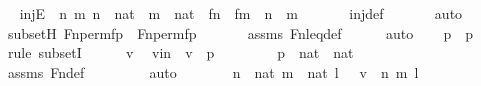 \begin{isabellebody}
\ \isamarkupfalse%
\ injE{\isacharcolon}{\kern0pt}\ {\isachardoublequoteopen}{\isasymAnd}\ n\ m{\isachardot}{\kern0pt}\ n\ {\isasymin}\ nat\ {\isasymLongrightarrow}\ m\ {\isasymin}\ nat\ {\isasymLongrightarrow}\ f{\isacharbackquote}{\kern0pt}n\ {\isacharequal}{\kern0pt}\ f{\isacharbackquote}{\kern0pt}m\ {\isasymLongrightarrow}\ n\ {\isacharequal}{\kern0pt}\ m{\isachardoublequoteclose}\ \isanewline
\ \ \ \ \isamarkupfalse%
\ inj{\isacharunderscore}{\kern0pt}def\ \isanewline
\ \ \ \ \isamarkupfalse%
\ auto\isanewline
\isanewline
\ \ \isamarkupfalse%
\ subsetH{\isacharcolon}{\kern0pt}\ {\isachardoublequoteopen}Fn{\isacharunderscore}{\kern0pt}perm{\isacharprime}{\kern0pt}{\isacharparenleft}{\kern0pt}f{\isacharparenright}{\kern0pt}{\isacharbackquote}{\kern0pt}p{\isacharprime}{\kern0pt}\ {\isasymsubseteq}\ Fn{\isacharunderscore}{\kern0pt}perm{\isacharprime}{\kern0pt}{\isacharparenleft}{\kern0pt}f{\isacharparenright}{\kern0pt}{\isacharbackquote}{\kern0pt}p{\isachardoublequoteclose}\ \isanewline
\ \ \ \ \isamarkupfalse%
\ assms\ Fn{\isacharunderscore}{\kern0pt}leq{\isacharunderscore}{\kern0pt}def\isanewline
\ \ \ \ \isamarkupfalse%
\ auto\isanewline
\ \ \isamarkupfalse%
\ {\isachardoublequoteopen}p{\isacharprime}{\kern0pt}\ {\isasymsubseteq}\ p{\isachardoublequoteclose}\ \isanewline
\ \ \isamarkupfalse%
\ {\isacharparenleft}{\kern0pt}rule\ subsetI{\isacharparenright}{\kern0pt}\isanewline
\ \ \ \ \isamarkupfalse%
\ v\ \isamarkupfalse%
\ vin\ {\isacharcolon}{\kern0pt}\ {\isachardoublequoteopen}v\ {\isasymin}\ p{\isacharprime}{\kern0pt}{\isachardoublequoteclose}\ \isanewline
\ \ \ \ \isamarkupfalse%
\ \isamarkupfalse%
\ {\isachardoublequoteopen}p{\isacharprime}{\kern0pt}\ {\isasymsubseteq}\ {\isacharparenleft}{\kern0pt}nat\ {\isasymtimes}\ nat{\isacharparenright}{\kern0pt}\ {\isasymtimes}\ {}{\isachardoublequoteclose}\isanewline
\ \ \ \ \ \ \isamarkupfalse%
\ assms\ Fn{\isacharunderscore}{\kern0pt}def\ \isanewline
\ \ \ \ \ \ \isamarkupfalse%
\ auto\isanewline
\ \ \ \ \isamarkupfalse%
\ \isamarkupfalse%
\ {\isachardoublequoteopen}{\isasymexists}n\ {\isasymin}\ nat{\isachardot}{\kern0pt}\ {\isasymexists}m\ {\isasymin}\ nat{\isachardot}{\kern0pt}\ {\isasymexists}l\ {\isasymin}\ {}{\isachardot}{\kern0pt}\ v\ {\isacharequal}{\kern0pt}\ {\isacharless}{\kern0pt}{\isacharless}{\kern0pt}n{\isacharcomma}{\kern0pt}\ m{\isachargreater}{\kern0pt}{\isacharcomma}{\kern0pt}\ l{\isachargreater}{\kern0pt}{\isachardoublequoteclose}\ \isanewline

\end{isabellebody}
